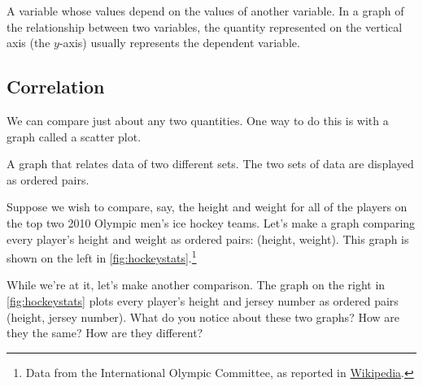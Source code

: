 \begin{boxdef}
A variable whose values depend on the values of another variable. In a graph of the relationship between two variables, the quantity represented on the vertical axis (the $y$-axis) usually represents the dependent variable.
\end{boxdef}

\subsection{Correlation}

We can compare just about any two quantities. One way to do this is with a graph called a \gls{scatter plot}.

\begin{boxdef}
A graph that relates data of two different sets. The two sets of data are displayed as ordered pairs.
\end{boxdef}

Suppose we wish to compare, say, the height and weight for all of the players on the top two 2010 Olympic men's ice hockey teams. Let's make a graph comparing every player's height and weight as ordered pairs: (height, weight). This graph is shown on the left in \cref{fig:hockeystats}.\footnote{Data from the International Olympic Committee, as reported in \href{http://en.wikipedia.org/wiki/Ice_hockey_at_the_2010_Winter_Olympics}{Wikipedia}.}

While we're at it, let's make another comparison. The graph on the right in \cref{fig:hockeystats} plots every player's height and jersey number as ordered pairs (height, jersey number). What do you notice about these two graphs? How are they the same? How are they different?

